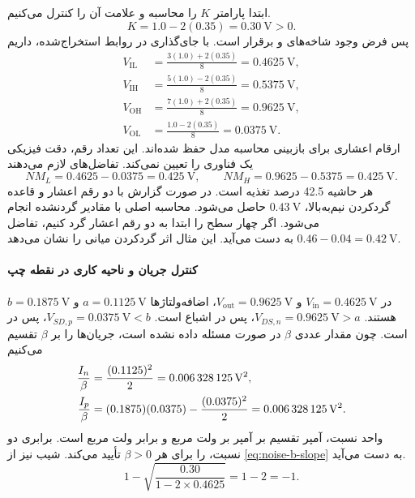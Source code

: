ابتدا پارامتر \(K\) را محاسبه و علامت آن را کنترل می‌کنیم.
\[
 K=1.0-2(0.35)=\qty{0.30}{\volt}>0.
\]
پس فرض وجود شاخه‌های  و  برقرار است.
با جای‌گذاری در روابط استخراج‌شده، داریم
\begin{align*}
 V_{\mathrm{IL}}&=\frac{3(1.0)+2(0.35)}{8}
 =\qty{0.4625}{\volt},\\
 V_{\mathrm{IH}}&=\frac{5(1.0)-2(0.35)}{8}
 =\qty{0.5375}{\volt},\\
 V_{\mathrm{OH}}&=\frac{7(1.0)+2(0.35)}{8}
 =\qty{0.9625}{\volt},\\
 V_{\mathrm{OL}}&=\frac{1.0-2(0.35)}{8}
 =\qty{0.0375}{\volt}.
\end{align*}
ارقام اعشاری برای بازبینی محاسبه مدل حفظ شده‌اند.
این تعداد رقم، دقت فیزیکی یک فناوری را تعیین نمی‌کند.
تفاضل‌های لازم می‌دهند
\begin{equation*}
 \boxed{NM_L=0.4625-0.0375=\qty{0.425}{\volt}},\qquad
 \boxed{NM_H=0.9625-0.5375=\qty{0.425}{\volt}}.
\end{equation*}
هر حاشیه \num{42.5} درصد تغذیه است.
در صورت گزارش با دو رقم اعشار و قاعده گردکردن نیم‌به‌بالا،
\(\qty{0.43}{\volt}\) حاصل می‌شود. محاسبه اصلی با مقادیر
گردنشده انجام می‌شود. اگر چهار سطح را ابتدا به دو رقم اعشار
گرد کنیم، تفاضل \(0.46-0.04=\qty{0.42}{\volt}\) به دست
می‌آید. این مثال اثر گردکردن میانی را نشان می‌دهد.

\paragraph*{کنترل جریان و ناحیه کاری در نقطه چپ}
در \(V_{\mathrm{in}}=\qty{0.4625}{\volt}\) و
\(V_{\mathrm{out}}=\qty{0.9625}{\volt}\)،
اضافه‌ولتاژها \(a=\qty{0.1125}{\volt}\) و
\(b=\qty{0.1875}{\volt}\) هستند.
\(V_{DS,n}=\qty{0.9625}{\volt}>a\)، پس  در
اشباع است. \(V_{SD,p}=\qty{0.0375}{\volt}<b\)، پس
 در  است.
چون مقدار عددی \(\beta\) در صورت مسئله داده نشده است،
جریان‌ها را بر \(\beta\) تقسیم می‌کنیم
\begin{align}
 \frac{I_n}{\beta}&=\frac{(0.1125)^2}{2}
 =\qty{0.006328125}{\volt\squared},\notag\\
 \frac{I_p}{\beta}&=(0.1875)(0.0375)-\frac{(0.0375)^2}{2}
 =\qty{0.006328125}{\volt\squared}.
 \label{eq:noise-ex17-kcl}
\end{align}
واحد نسبت، آمپر تقسیم بر آمپر بر ولت مربع و برابر ولت مربع است.
برابری دو نسبت،  را برای هر \(\beta>0\) تأیید می‌کند.
شیب نیز از \eqref{eq:noise-b-slope} به دست می‌آید.
\[
 1-\sqrt{\frac{0.30}{1-2\times0.4625}}=1-2=-1.
\]

